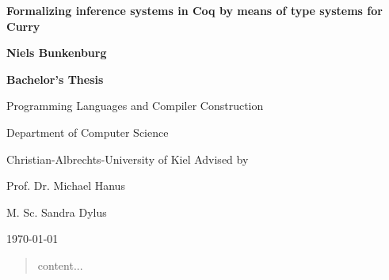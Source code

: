 \documentclass[paper = a4, fleqn, abstract=on, twoside]{scrreprt}
\begin{document}

\begin{titlepage}
	\vspace*{3cm}
	\centering
	{\huge\bfseries Formalizing inference systems in Coq by means of type systems for Curry\par}
	\vspace{1cm}
	\textbf{Niels Bunkenburg} \par 
	\vspace{6cm}
	\textbf{Bachelor's Thesis} \par
	Programming Languages and Compiler Construction \par
	Department of Computer Science \par
	Christian-Albrechts-University of Kiel
	\vfill
	Advised by\par
	Prof. Dr. Michael Hanus \par
	M. Sc. Sandra Dylus
	\vfill
	{\large \today\par}
\end{titlepage}

\begin{abstract}
	content...
\end{abstract}

\renewcommand{\contentsname}{Contents}
\tableofcontents   %
\listoffigures     %

\newpage               %


%   
%   
\end{document}
